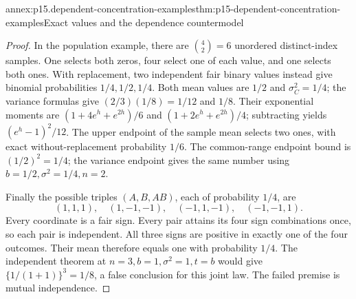 \begin{annexitem}{annex:p15.dependent-concentration-examples}{thm:p15-dependent-concentration-examples}{Exact values and the dependence countermodel}
\begin{proof}
In the population example, there are \(\binom42=6\) unordered
distinct-index samples. One selects both zeros, four select one of
each value, and one selects both ones. With replacement, two independent
fair binary values instead give binomial probabilities \(1/4,1/2,1/4\).
Both mean values are \(1/2\) and \(\sigma_C^2=1/4\);
the variance formulas give \((2/3)(1/8)=1/12\) and \(1/8\).
Their exponential moments are
\((1+4e^h+e^{2h})/6\) and \((1+2e^h+e^{2h})/4\);
subtracting yields \((e^h-1)^2/12\).
The upper endpoint of the sample mean selects two ones, with exact
without-replacement probability \(1/6\).
The common-range endpoint bound is \((1/2)^2=1/4\);
the variance endpoint gives the same number using
\(b=1/2,\sigma^2=1/4,n=2\).

Finally the possible triples \((A,B,AB)\), each of probability \(1/4\),
are
\[
 (1,1,1),\quad(1,-1,-1),\quad(-1,1,-1),\quad(-1,-1,1).
\]
Every coordinate is a fair sign. Every pair attains its four sign
combinations once, so each pair is independent.
All three signs are positive in exactly one of the four outcomes.
Their mean therefore equals one with probability \(1/4\).
The independent theorem at \(n=3,b=1,\sigma^2=1,t=b\) would give
\(\{1/(1+1)\}^3=1/8\), a false conclusion for this joint law.
The failed premise is mutual independence.
\end{proof}
\end{annexitem}
